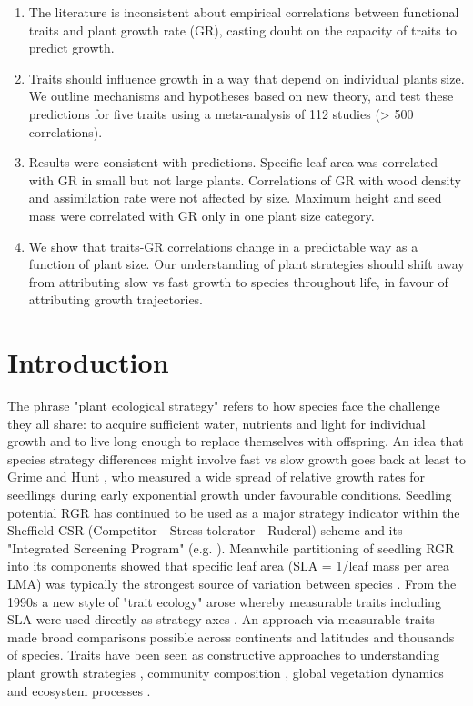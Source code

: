 \documentclass[a4paper]{article}\usepackage[]{graphicx}\usepackage[]{color}
\begin{document}
\begin{enumerate}

\item
The literature is inconsistent about empirical correlations between functional traits and plant growth rate (GR), casting doubt on the capacity of traits to predict growth.

\item 
Traits should influence growth in a way that depend on individual plants size. We outline mechanisms and hypotheses based on new theory, and test these predictions for five traits using a meta-analysis of 112 studies (\textgreater{} 500 correlations).

\item
Results were consistent with predictions. Specific leaf area was correlated with GR in small but not large plants. Correlations of GR with wood density and assimilation rate were not affected by size. Maximum height and seed mass were correlated with GR only in one plant size category.

\item 
We show that traits-GR correlations change in a predictable way as a function of plant size. Our understanding of plant strategies should shift away from attributing slow vs fast growth to species throughout life, in favour of attributing growth trajectories.

 
\end{enumerate}


\section*{Introduction}\label{introduction}


The phrase "plant ecological strategy" refers to how species face the challenge they all share:  to acquire sufficient water, nutrients and light for individual growth and to live long enough to replace themselves with offspring. An idea that species strategy differences might involve fast vs slow growth goes back at least to Grime and Hunt \citeyearpar{Grime:1975gr}, who measured a wide spread of relative growth rates for seedlings during early exponential growth under favourable conditions. Seedling potential RGR has continued to be used as a major strategy indicator within the Sheffield CSR (Competitor - Stress tolerator - Ruderal) scheme and its "Integrated Screening Program" (e.g. \citealt{grime1979plant, Grime:1997wm}). Meanwhile partitioning of seedling RGR into its components showed that specific leaf area (SLA = 1/leaf mass per area LMA) was typically the strongest source of variation between species \citep{Poorter:1989tx}. From the 1990s a new style of "trait ecology" arose whereby measurable traits including SLA were used directly as strategy axes \citep{Westoby:2002ft}. An approach via measurable traits made broad comparisons possible across continents and latitudes and thousands of species. Traits have been seen as constructive approaches to understanding plant growth strategies \citep{Grime:1977kc,Chapin:1980gz}, community composition \citep{Lavorel:2002ff,Shipley:2006ie}, global vegetation dynamics \citep{Scheiter:2013ed} and ecosystem processes \citep{Lavorel:2002ff}.
\end{document}
